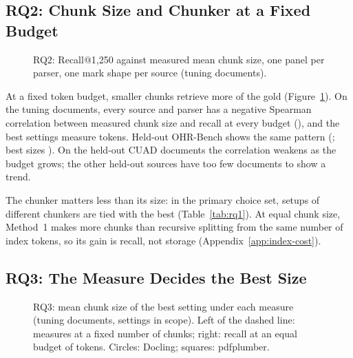 \subsection{RQ2: Chunk Size and Chunker at a Fixed Budget}
\label{sec:rq2}

\begin{figure}[t]
\centering
{}
\caption{RQ2: Recall@1,250 against measured mean chunk size, one panel per parser, one mark shape per source (tuning documents).}
\label{fig:rq2}
\end{figure}

At a fixed token budget, smaller chunks retrieve more of the gold
(Figure~\ref{fig:rq2}). On the tuning documents, every source and parser
has a negative Spearman correlation between measured chunk size and
recall at every budget (\RQtwoRhoRange{}), and the best settings measure
\RQtwoBestSizes{} tokens. Held-out OHR-Bench shows the same pattern
(\RQtwoHeldOutOHRRhoRange{}; best sizes \RQtwoHeldOutOHRBestSizes{}). On
the held-out CUAD documents the correlation weakens as the budget grows;
the other held-out sources have too few documents to show a trend.

The chunker matters less than its size: in the primary choice set,
setups of different chunkers are tied with the best
(Table~\ref{tab:rq1}). At equal chunk size, Method~1 makes more chunks
than recursive splitting from the same number of index tokens, so its
gain is recall, not storage (Appendix~\ref{app:index-cost}).

\subsection{RQ3: The Measure Decides the Best Size}
\label{sec:rq3}

\begin{figure}[t]
\centering
{}
\caption{RQ3: mean chunk size of the best setting under each measure (tuning documents, settings in scope). Left of the dashed line: measures at a fixed number of chunks; right: recall at an equal budget of \FixedKBudget{} tokens. Circles: Docling; squares: pdfplumber.}
\label{fig:rq3}
\end{figure}

